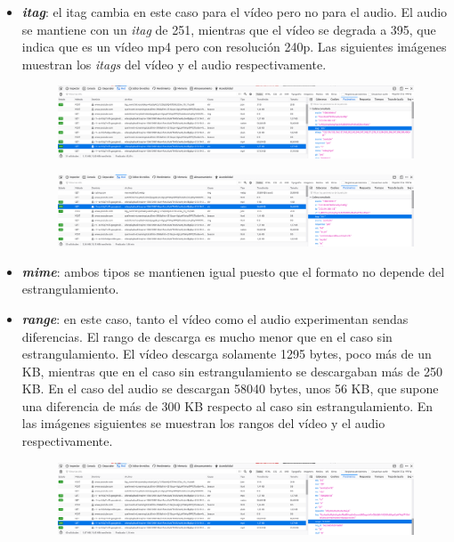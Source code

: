 \documentclass[11pt,a4paper]{article}
\begin{document}
\begin{itemize}
	\item \textbf{\textit{itag}}: el itag cambia en este caso para el vídeo pero no para el audio. El audio se mantiene con un \textit{itag} de 251, mientras que el vídeo se degrada a 395, que indica que es un vídeo mp4 pero con resolución 240p. Las siguientes imágenes muestran los \textit{itags} del vídeo y el audio respectivamente.
	
	\begin{figure}[H]
		\centering
		\includegraphics[scale=0.22]{img/itag2g.png}
	\end{figure}
	
	\begin{figure}[H]
		\centering
		\includegraphics[scale=0.22]{img/itagaudio2g.png}
	\end{figure}
	
	\item \textbf{\textit{mime}}: ambos tipos se mantienen igual puesto que el formato no depende del estrangulamiento.
	
	\item \textbf{\textit{range}}: en este caso, tanto el vídeo como el audio experimentan sendas diferencias. El rango de descarga es mucho menor que en el caso sin estrangulamiento. El vídeo descarga solamente 1295 bytes, poco más de un KB, mientras que en el caso sin estrangulamiento se descargaban más de 250 KB. En el caso del audio se descargan 58040 bytes, unos 56 KB, que supone una diferencia de más de 300 KB respecto al caso sin estrangulamiento. En las imágenes siguientes se muestran los rangos del vídeo y el audio respectivamente.
	
	\begin{figure}[H]
		\centering
		\includegraphics[scale=0.22]{img/range2g.png}
	\end{figure}
	

\end{itemize}
\end{document}
